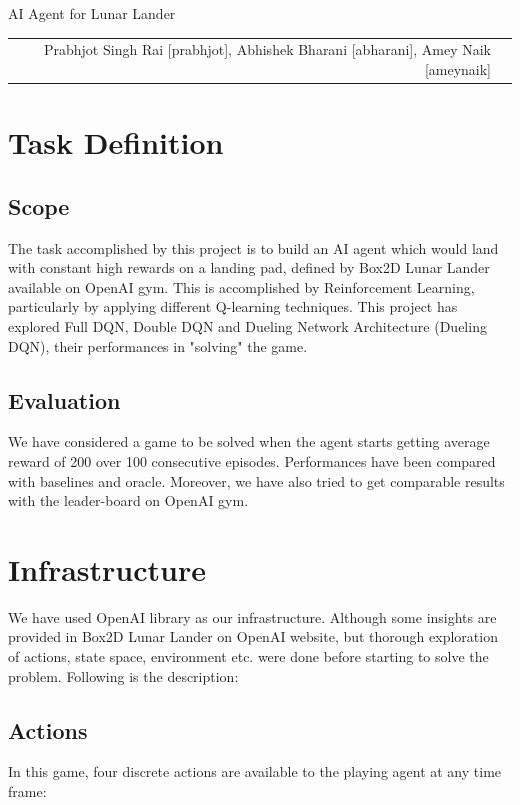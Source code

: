 \documentclass[12pt]{article}
\begin{document}
\begin{center}
{\Large AI Agent for Lunar Lander}

\begin{tabular}{rl}
Prabhjot Singh Rai [prabhjot], Abhishek Bharani [abharani], Amey Naik [ameynaik]
\end{tabular}
\end{center}

\section{Task Definition}

\subsection{Scope}

The task accomplished by this project is to build an AI agent which would land with constant high rewards on a landing pad, defined by Box2D Lunar Lander available on OpenAI gym. This is accomplished by Reinforcement Learning, particularly by applying different Q-learning techniques. This project has explored Full DQN, Double DQN and Dueling Network Architecture (Dueling DQN), their performances in "solving" the game. 

\subsection{Evaluation}

We have considered a game to be solved when the agent starts getting average reward of 200 over 100 consecutive episodes. Performances have been compared with baselines and oracle. Moreover, we have also tried to get comparable results with the leader-board on OpenAI gym.

\section{Infrastructure}

We have used OpenAI library as our infrastructure. Although some insights are provided in Box2D Lunar Lander on OpenAI website, but thorough exploration of actions, state space, environment etc. were done before starting to solve the problem. Following is the description:

\subsection{Actions}
In this game, four discrete actions are available to the playing agent at any time frame: 
\end{document}
